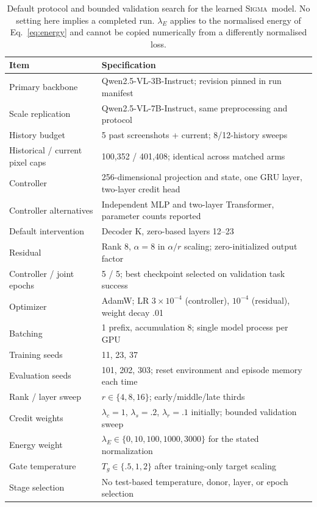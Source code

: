\documentclass{article}
\newcommand{\method}{\textsc{Sigma}}
\begin{document}
\begin{table}[h]
\caption{Default protocol and bounded validation search for the learned \method\
model. No setting here implies a completed run. $\lambda_E$ applies to the
normalised energy of Eq.~\eqref{eq:energy} and cannot be copied numerically from
a differently normalised loss.}
\label{tab:protocol}
\centering\small
\begin{tabular}{L{.33\linewidth}L{.57\linewidth}}
\toprule
Item & Specification\\
\midrule
Primary backbone & Qwen2.5-VL-3B-Instruct; revision pinned in run manifest\\
Scale replication & Qwen2.5-VL-7B-Instruct, same preprocessing and protocol\\
History budget & 5 past screenshots + current; 8/12-history sweeps\\
Historical / current pixel caps & 100{,}352 / 401{,}408; identical across matched arms\\
Controller & 256-dimensional projection and state, one GRU layer, two-layer credit head\\
Controller alternatives & Independent MLP and two-layer Transformer, parameter counts reported\\
Default intervention & Decoder K, zero-based layers 12--23\\
Residual & Rank 8, $\alpha=8$ in $\alpha/r$ scaling; zero-initialized output factor\\
Controller / joint epochs & 5 / 5; best checkpoint selected on validation task success\\
Optimizer & AdamW; LR $3\times10^{-4}$ (controller), $10^{-4}$ (residual), weight decay .01\\
Batching & 1 prefix, accumulation 8; single model process per GPU\\
Training seeds & 11, 23, 37\\
Evaluation seeds & 101, 202, 303; reset environment and episode memory each time\\
Rank / layer sweep & $r\in\{4,8,16\}$; early/middle/late thirds\\
Credit weights & $\lambda_c=1$, $\lambda_s=.2$, $\lambda_r=.1$ initially; bounded validation sweep\\
Energy weight & $\lambda_E\in\{0,10,100,1000,3000\}$ for the stated normalization\\
Gate temperature & $T_g\in\{.5,1,2\}$ after training-only target scaling\\
Stage selection & No test-based temperature, donor, layer, or epoch selection\\
\bottomrule
\end{tabular}
\end{table}
\end{document}
